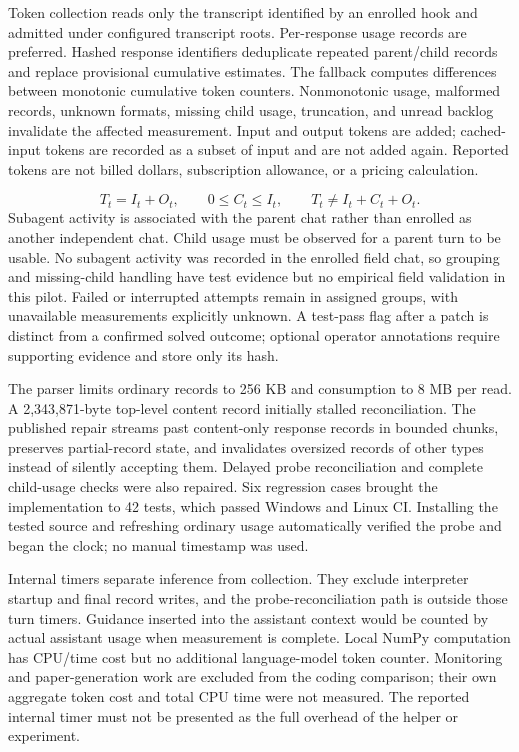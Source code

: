 \documentclass[11pt]{article}
\begin{document}
Token collection reads only the transcript identified by an enrolled hook and admitted under configured transcript roots. Per-response usage records are preferred. Hashed response identifiers deduplicate repeated parent/child records and replace provisional cumulative estimates. The fallback computes differences between monotonic cumulative token counters. Nonmonotonic usage, malformed records, unknown formats, missing child usage, truncation, and unread backlog invalidate the affected measurement. Input and output tokens are added; cached-input tokens are recorded as a subset of input and are not added again. Reported tokens are not billed dollars, subscription allowance, or a pricing calculation.

\[
T_t=I_t+O_t,\qquad 0\leq C_t\leq I_t,\qquad T_t\ne I_t+C_t+O_t.
\]
Subagent activity is associated with the parent chat rather than enrolled as another independent chat. Child usage must be observed for a parent turn to be usable. No subagent activity was recorded in the enrolled field chat, so grouping and missing-child handling have test evidence but no empirical field validation in this pilot. Failed or interrupted attempts remain in assigned groups, with unavailable measurements explicitly unknown. A test-pass flag after a patch is distinct from a confirmed solved outcome; optional operator annotations require supporting evidence and store only its hash.

The parser limits ordinary records to 256 KB and consumption to 8 MB per read. A 2,343,871-byte top-level content record initially stalled reconciliation. The published repair streams past content-only response records in bounded chunks, preserves partial-record state, and invalidates oversized records of other types instead of silently accepting them. Delayed probe reconciliation and complete child-usage checks were also repaired. Six regression cases brought the implementation to 42 tests, which passed Windows and Linux CI. Installing the tested source and refreshing ordinary usage automatically verified the probe and began the clock; no manual timestamp was used.

Internal timers separate inference from collection. They exclude interpreter startup and final record writes, and the probe-reconciliation path is outside those turn timers. Guidance inserted into the assistant context would be counted by actual assistant usage when measurement is complete. Local NumPy computation has CPU/time cost but no additional language-model token counter. Monitoring and paper-generation work are excluded from the coding comparison; their own aggregate token cost and total CPU time were not measured. The reported internal timer must not be presented as the full overhead of the helper or experiment.
\end{document}
